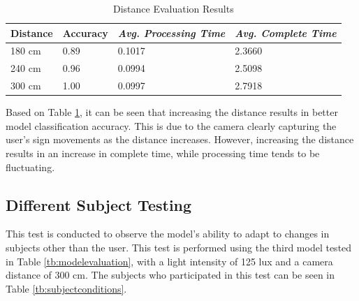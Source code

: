 \begin{table}[H]
  \caption{Distance Evaluation Results}
  \label{tb:distanceevaluation}
  \centering
  \begin{tabular}{llll}
    \hline
    \textbf{Distance} & \textbf{Accuracy} & \emph{\textbf{Avg. Processing Time}} & \emph{\textbf{Avg. Complete Time}} \\
    \hline
    180 cm & 0.89 & 0.1017 & 2.3660 \\
    240 cm & 0.96 & 0.0994 & 2.5098 \\
    300 cm & 1.00 & 0.0997 & 2.7918 \\
    \hline
  \end{tabular}
\end{table}

Based on Table \ref{tb:distanceevaluation}, it can be seen that increasing the distance results in better model classification accuracy. This is due to the camera clearly capturing the user's sign movements as the distance increases. However, increasing the distance results in an increase in complete time, while processing time tends to be fluctuating.

\subsection{Different Subject Testing}
\label{sec:subjectanalysis}

This test is conducted to observe the model's ability to adapt to changes in subjects other than the user. This test is performed using the third model tested in Table \ref{tb:modelevaluation}, with a light intensity of 125 lux and a camera distance of 300 cm. The subjects who participated in this test can be seen in Table \ref{tb:subjectconditions}.


